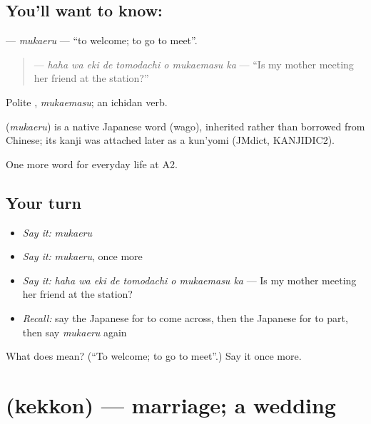 \subsection*{You'll want to know: }
\textbf{} — \emph{mukaeru} — \textquotedblleft{}to welcome; to go to meet\textquotedblright{}.

\begin{quote}
\textbf{   } — \emph{haha wa eki de tomodachi o mukaemasu ka} — \textquotedblleft{}Is my mother meeting her friend at the station?\textquotedblright{}
\end{quote}

Polite \textbf{}, \emph{mukaemasu}; an ichidan verb.

\begin{cousinweb}
\textbf{} (\emph{mukaeru}) is a native Japanese word (wago), inherited rather than borrowed from Chinese; its kanji was attached later as a kun'yomi (JMdict, KANJIDIC2).
\end{cousinweb}

\begin{grammarlens}[title={What you've built}]
One more word for everyday life at A2.
\end{grammarlens}

\subsection*{Your turn}
\begin{itemize}
\raggedright
  \item \emph{Say it:} \emph{mukaeru}
  \item \emph{Say it:} \emph{mukaeru}, once more
  \item \emph{Say it:} \emph{haha wa eki de tomodachi o mukaemasu ka} — Is my mother meeting her friend at the station?
  \item \emph{Recall:} say the Japanese for to come across, then the Japanese for to part, then say \emph{mukaeru} again
\end{itemize}

\begin{tcolorbox}[breakable,colback=teal!4,colframe=teal!35!black,title={Before you move on}]
What does  mean? (\textquotedblleft{}To welcome; to go to meet\textquotedblright{}.) Say it once more.
\end{tcolorbox}
\section[\texorpdfstring{\ja{けっこん} (kekkon)}{けっこん (kekkon)}]{ (kekkon) — marriage; a wedding}

